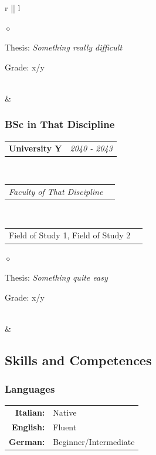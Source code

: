 \documentclass[a4paper]{article}
\makeatletter
\newlength{\sectsep}
\newlength{\subsectsep}
\newcommand{\headerrow}[2]
{\begin{tabular*}{\textwidth}{l@{\extracolsep{\fill}}r}
    #1 &
    #2 \\
\end{tabular*}}
\renewenvironment{itemize}{
  \begin{list}{$\diamond$}{
    \setlength{\topsep}{0.25em}
    \setlength{\itemsep}{0em}
    \setlength{\parskip}{0pt}
    \setlength{\parsep}{0em}
  }
}{
  \end{list}
}
\makeatother
\begin{document}
\begin{longtable}{r || l}
\begin{minipage}{0.9\textwidth}
      \begin{itemize}
          \item Thesis: \emph{Something really difficult}
          \item Grade: x/y
      \end{itemize}
  \end{minipage} \\[\sectsep]

  & \begin{minipage}{0.9\textwidth}
      \vspace{\subsectsep}
      \subsubsection*{BSc in That Discipline}
      \headerrow
        {\textbf{University Y}}{\emph{2040 - 2043}}
      \\
      \headerrow
        {\emph{Faculty of That Discipline}}{}
      \\
      \headerrow
        {Field of Study 1, Field of Study 2}{}

      \begin{itemize}
          \item Thesis: \emph{Something quite easy}
          \item Grade: x/y
      \end{itemize}
      \vfill
  \end{minipage} \\[\sectsep]

  & \begin{minipage}{0.9\textwidth}
      \vspace{\sectsep}
      \subsection*{Skills and Competences}
      \subsubsection*{Languages}
      \begin{tabular}{rl}
        \textbf{Italian:}&Native\\
        \textbf{English:}&Fluent\\
        \textbf{German:}&Beginner/Intermediate\\
      \end{tabular} \vspace{1.5ex} \\
    \end{minipage} \\[\sectsep]


\end{longtable}
\end{document}
